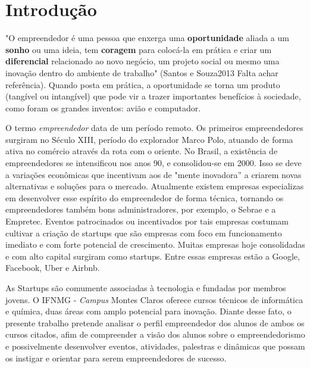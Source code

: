 \chapter{Introdução}\label{capitulo1}

"O empreendedor é uma pessoa que enxerga uma \textbf{oportunidade} aliada a um \textbf{sonho} ou uma ideia, tem \textbf{coragem} para colocá-la em prática e criar um \textbf{diferencial} relacionado ao novo negócio, um projeto social ou mesmo uma inovação dentro do ambiente de trabalho" (Santos e Souza2013 Falta achar referência). Quando posta em prática, a oportunidade se torna um produto (tangível ou intangível) que pode vir a trazer importantes benefícios à sociedade, como foram os grandes inventos: avião e computador.

 O termo \textit{empreendedor} data de um período remoto. Os primeiros empreendedores surgiram no Século XIII, período do explorador Marco Polo, atuando de forma ativa no comércio através da rota com o oriente. No Brasil, a existência de empreendedores se intensificou nos anos 90, e consolidou-se em 2000. Isso se deve a variações econômicas que incentivam aos de "mente inovadora” a criarem novas alternativas e soluções para o mercado. Atualmente existem empresas especializas em desenvolver esse espírito do empreendedor de forma técnica, tornando os empreendedores também bons administradores, por exemplo, o Sebrae e a Empretec. Eventos patrocinados ou incentivados por tais empresas costumam cultivar a criação de startups que são empresas com foco em funcionamento imediato e com forte potencial de crescimento. Muitas empresas hoje consolidadas e com alto capital surgiram como startups. Entre essas empresas estão a Google, Facebook, Uber e Airbnb.
    
As Startups são comumente associadas à tecnologia e fundadas por membros jovens. O IFNMG - \textit{Campus} Montes Claros oferece cursos técnicos de informática e química, duas áreas com amplo potencial para inovação. Diante desse fato, o presente trabalho pretende analisar o perfil empreendedor dos alunos de ambos os cursos citados, afim de compreender a visão dos alunos sobre o empreendedorismo e possivelmente desenvolver eventos, atividades, palestras e dinâmicas que possam os instigar e orientar para serem empreendedores de sucesso.